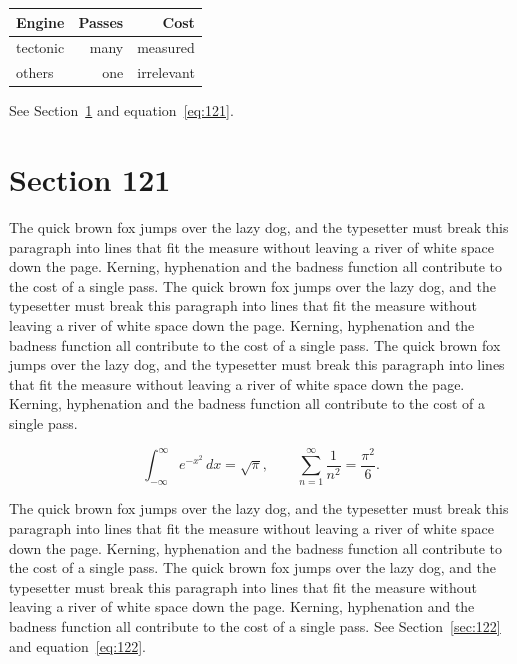 \documentclass{article}
\begin{document}
\begin{center}
\begin{tabular}{lrr}
\toprule
Engine & Passes & Cost \\
\midrule
tectonic & many & measured \\
others & one & irrelevant \\
\bottomrule
\end{tabular}
\end{center}

See Section~\ref{sec:121} and equation~\eqref{eq:121}.
\section{Section 121}
\label{sec:121}
The quick brown fox jumps over the lazy dog, and the typesetter must break this paragraph into lines that fit the measure without leaving a river of white space down the page. Kerning, hyphenation and the badness function all contribute to the cost of a single pass. The quick brown fox jumps over the lazy dog, and the typesetter must break this paragraph into lines that fit the measure without leaving a river of white space down the page. Kerning, hyphenation and the badness function all contribute to the cost of a single pass. The quick brown fox jumps over the lazy dog, and the typesetter must break this paragraph into lines that fit the measure without leaving a river of white space down the page. Kerning, hyphenation and the badness function all contribute to the cost of a single pass. 

\begin{equation}\label{eq:121}
\int_{-\infty}^{\infty} e^{-x^{2}}\,dx = \sqrt{\pi}, \qquad
\sum_{n=1}^{\infty} \frac{1}{n^{2}} = \frac{\pi^{2}}{6}.
\end{equation}

The quick brown fox jumps over the lazy dog, and the typesetter must break this paragraph into lines that fit the measure without leaving a river of white space down the page. Kerning, hyphenation and the badness function all contribute to the cost of a single pass. The quick brown fox jumps over the lazy dog, and the typesetter must break this paragraph into lines that fit the measure without leaving a river of white space down the page. Kerning, hyphenation and the badness function all contribute to the cost of a single pass. 
See Section~\ref{sec:122} and equation~\eqref{eq:122}.
\end{document}
